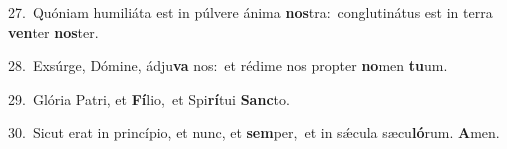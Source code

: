 {\numbfont\textcolor{\numbcolor}{27.}}~Quóniam humiliáta est in púlvere ánima \textbf{nos}\-tra:~\star conglutinátus est in terra \textbf{ven}\-ter \textbf{nos}\-ter.\par
{\numbfont\textcolor{\numbcolor}{28.}}~Exsúrge, Dómine, ádju\textbf{va} nos:~\star et rédime nos propter \textbf{no}\-men \textbf{tu}\-um.\par
{\numbfont\textcolor{\numbcolor}{29.}}~Glória Patri, et \textbf{Fí}\-lio,~\star et Spi\-\textbf{rí}\-tui \textbf{Sanc}\-to.\par
{\numbfont\textcolor{\numbcolor}{30.}}~Sicut erat in princípio, et nunc, et \textbf{sem}\-per,~\star et in sǽcula sæcu\-\textbf{ló}\-rum. \textbf{A}\-men.\par
